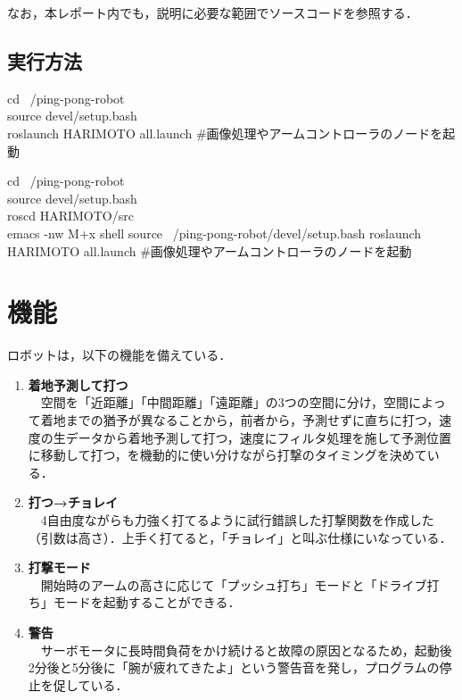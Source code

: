 \documentclass[10pt, oneside, titlepage]{ltjsarticle}  %
\begin{document}
なお，本レポート内でも，説明に必要な範囲でソースコードを参照する．

\subsection{実行方法}
\begin{screen}
  cd ~/ping-pong-robot \\
  source devel/setup.bash \\
  roslaunch HARIMOTO all.launch \#画像処理やアームコントローラのノードを起動
\end{screen}
\begin{screen}
cd ~/ping-pong-robot\\
source devel/setup.bash \\
roscd HARIMOTO/src \\
emacs -nw 
M+x shell
source ~/ping-pong-robot/devel/setup.bash
roslaunch HARIMOTO all.launch \#画像処理やアームコントローラのノードを起動
\end{screen}
\section{機能}
ロボットは，以下の機能を備えている．
\begin{enumerate}
\item {\bf 着地予測して打つ} \\
　空間を「近距離」「中間距離」「遠距離」の3つの空間に分け，空間によって着地までの猶予が異なることから，前者から，予測せずに直ちに打つ，速度の生データから着地予測して打つ，速度にフィルタ処理を施して予測位置に移動して打つ，を機動的に使い分けながら打撃のタイミングを決めている．
\item {\bf 打つ→チョレイ} \\
　4自由度ながらも力強く打てるように試行錯誤した打撃関数を作成した（引数は高さ）．上手く打てると，「チョレイ」と叫ぶ仕様にいなっている．
\item {\bf 打撃モード} \\
　開始時のアームの高さに応じて「プッシュ打ち」モードと「ドライブ打ち」モードを起動することができる．
\item {\bf 警告} \\
　サーボモータに長時間負荷をかけ続けると故障の原因となるため，起動後2分後と5分後に「腕が疲れてきたよ」という警告音を発し，プログラムの停止を促している．
\end{enumerate}
\end{document}
